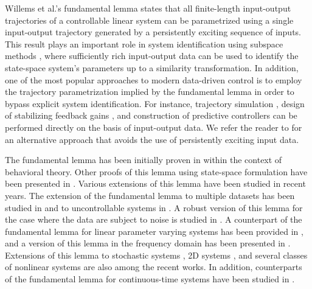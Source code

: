 \documentclass[journal,twoside,web]{ieeecolor}
\begin{document}
Willems et al.'s fundamental lemma \cite{willems2005note} states that all finite-length input-output trajectories of a controllable linear system can be parametrized using a single input-output trajectory generated by a persistently exciting sequence of inputs. This result plays an important role in system identification using subspace methods \cite{VERHAEGEN01111992}, where sufficiently rich input-output data can be used to identify the state-space system's parameters up to a similarity transformation. In addition, one of the most popular approaches to modern data-driven control is to employ the trajectory parametrization implied by the fundamental lemma in order to bypass explicit system identification. For instance, trajectory simulation \cite{markovsky2008data}, design of stabilizing feedback gains \cite{de2019formulas}, and construction of predictive controllers \cite{coulson2019data,berberich2020data} can be performed directly on the basis of input-output data. We refer the reader to \cite{van2020data,van2023informativity} for an alternative approach that avoids the use of persistently exciting input data. 

The fundamental lemma has been initially proven in \cite{willems2005note} within the context of behavioral theory. Other proofs of this lemma using state-space formulation have been presented in \cite{van2020willems,coulson2022quantitative,berberich2023quantitative}. Various extensions of this lemma have been studied in recent years. The extension of the fundamental lemma to multiple datasets has been studied in \cite{van2020willems} and to uncontrollable systems in \cite{yu2021controllability}. A robust version of this lemma for the case where the data are subject to noise is studied in \cite{coulson2022quantitative}. A counterpart of the fundamental lemma for linear parameter varying systems has been provided in \cite{verhoek2021fundamental}, and a version of this lemma in the frequency domain has been presented in \cite{meijer2023frequency}. Extensions of this lemma to stochastic systems \cite{pan2022stochastic}, 2D systems \cite{rapisarda2024input}, and several classes of nonlinear systems \cite{alsalti2023data,markovsky2022data,shang2024willems} are also among the recent works. In addition, counterparts of the fundamental lemma for continuous-time systems have been studied in \cite{rapisarda2023fundamental,lopez2024input}. 
\end{document}
